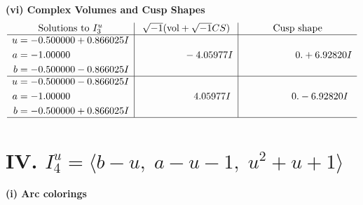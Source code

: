 \documentclass[1p]{elsarticle_modified}
\theoremstyle{definition}
\newcommand{\I}{\sqrt{-1}}
\begin{document}
\newpage\flushleft \textbf{(vi) Complex Volumes and Cusp Shapes}
$$\begin{array}{c|c|c}  
\text{Solutions to }I^u_{3}& \I (\text{vol} + \sqrt{-1}CS) & \text{Cusp shape}\\
 \hline 
\begin{aligned}
u &= -0.500000 + 0.866025 I \\
a &= -1.00000\phantom{ +0.000000I} \\
b &= -0.500000 - 0.866025 I\end{aligned}
 & \phantom{-0.000000 } -4.05977 I & \phantom{-0.000000 -}0. + 6.92820 I \\ \hline\begin{aligned}
u &= -0.500000 - 0.866025 I \\
a &= -1.00000\phantom{ +0.000000I} \\
b &= -0.500000 + 0.866025 I\end{aligned}
 & \phantom{-0.000000 -}4.05977 I & \phantom{-0.000000 } 0. - 6.92820 I\\
 \hline 
 \end{array}$$\newpage\newpage\renewcommand{\arraystretch}{1}
\centering \section*{IV. $I^u_{4}= \langle b- u,\;a- u-1,\;u^2+u+1 \rangle$}
\flushleft \textbf{(i) Arc colorings}\\
\end{document}

